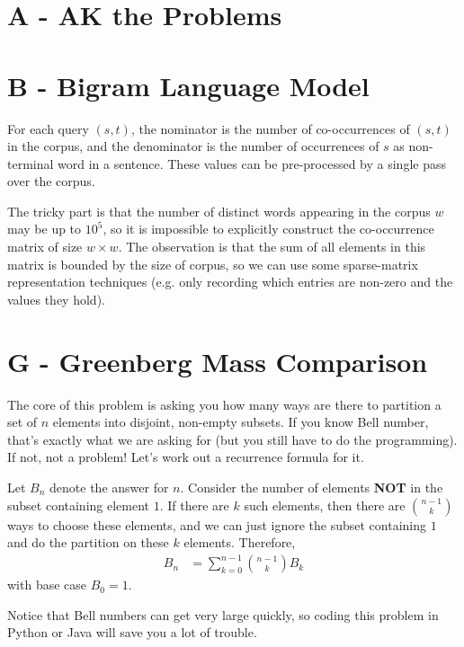 \documentclass{article}
\begin{document}
\section*{A - AK the Problems}

\section*{B - Bigram Language Model}

For each query $(s,t)$, the nominator is the number of co-occurrences of $(s,t)$ in the corpus, and the denominator is the number of occurrences of $s$ as non-terminal word in a sentence. These values can be pre-processed by a single pass over the corpus. 

The tricky part is that the number of distinct words appearing in the corpus $w$ may be up to $10^5$, so it is impossible to explicitly construct the co-occurrence matrix of size $w \times w$. The observation is that the sum of all elements in this matrix is bounded by the size of corpus, so we can use some sparse-matrix representation techniques (e.g. only recording which entries are non-zero and the values they hold). 

\section*{G - Greenberg Mass Comparison}

The core of this problem is asking you how many ways are there to partition a set of $n$ elements into disjoint, non-empty subsets. If you know Bell number, that's exactly what we are asking for (but you still have to do the programming). If not, not a problem! Let's work out a recurrence formula for it. 

Let $B_n$ denote the answer for $n$. Consider the number of elements \textbf{NOT} in the subset containing element $1$. If there are $k$ such elements, then there are $\binom{n-1}{k}$ ways to choose these elements, and we can just ignore the subset containing $1$ and do the partition on these $k$ elements. Therefore, 
\begin{align*}
	B_n &= \sum_{k=0}^{n-1}{\binom{n-1}{k} B_k}
\end{align*}
with base case $B_0 = 1$. 

Notice that Bell numbers can get very large quickly, so coding this problem in Python or Java will save you a lot of trouble. 
\end{document}

